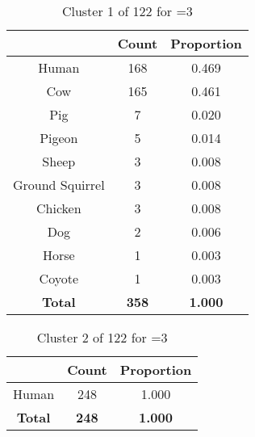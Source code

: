 \begin{table}[ht!]
\centering
\begin{tabular}{|c|c|c|}
\hline
\bf \Spec{} &\bf Count &\bf Proportion\\ \hline \hline
Human & 168 & 0.469\\ \hline
Cow & 165 & 0.461\\ \hline
Pig & 7 & 0.020\\ \hline
Pigeon & 5 & 0.014\\ \hline
Sheep & 3 & 0.008\\ \hline
Ground Squirrel & 3 & 0.008\\ \hline
Chicken & 3 & 0.008\\ \hline
Dog & 2 & 0.006\\ \hline
Horse & 1 & 0.003\\ \hline
Coyote & 1 & 0.003\\ \hline
\hline
\bf Total & \bf 358 & \bf 1.000\\ \hline
\end{tabular}
\label{tab:cluster:1:3}
\caption{Cluster 1 of 122 for \minneigh{}=3}
\end{table}

\begin{table}[ht!]
\centering
\begin{tabular}{|c|c|c|}
\hline
\bf \Spec{} &\bf Count &\bf Proportion\\ \hline \hline
Human & 248 & 1.000\\ \hline
\hline
\bf Total & \bf 248 & \bf 1.000\\ \hline
\end{tabular}
\label{tab:cluster:2:3}
\caption{Cluster 2 of 122 for \minneigh{}=3}
\end{table}

